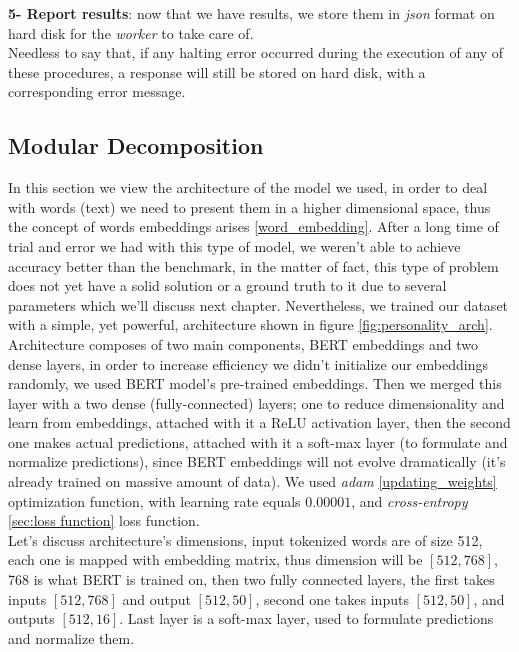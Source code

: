 \textbf{5- Report results}: now that we have results, we store them in \textit{json} format on hard disk for the \textit{worker} to take care of. \\


Needless to say that, if any halting error occurred during the execution of any of these procedures, a response will still be stored on hard disk, with a corresponding error message.


\subsection{Modular Decomposition}
In this section we view the architecture of the model we used, in order to deal with words (text) we need to present them in a higher dimensional space, thus the concept of words embeddings arises \ref{word_embedding}. After a long time of trial and error we had with this type of model, we weren't able to achieve accuracy better than the benchmark, in the matter of fact, this type of problem does not yet have a solid solution or a ground truth to it due to several parameters which we'll discuss next chapter. Nevertheless, we trained our dataset with a simple, yet powerful, architecture shown in figure \ref{fig:personality_arch}.\\

Architecture composes of two main components, BERT embeddings and two dense layers, in order to increase efficiency we didn't initialize our embeddings randomly, we used BERT model's pre-trained embeddings. Then we merged this layer with a two dense (fully-connected) layers; one to reduce dimensionality and learn from embeddings, attached with it a ReLU activation layer, then the second one makes actual predictions, attached with it a soft-max layer (to formulate and normalize predictions), since BERT embeddings will not evolve dramatically (it's already trained on massive amount of data).
We used \textit{adam} \ref{updating_weights} optimization function, with learning rate equals $0.00001$, and \textit{cross-entropy} \ref{sec:loss function} loss function.\\

Let's discuss architecture's dimensions, input tokenized words are of size 512, each one is mapped with embedding matrix, thus dimension will be $[512,768]$, 768 is what BERT is trained on, then two fully connected layers, the first takes inputs $[512,768]$ and output $[512,50]$, second one takes inputs $[512,50]$, and outputs $[512,16]$. Last layer is a soft-max layer, used to formulate predictions and normalize them.


